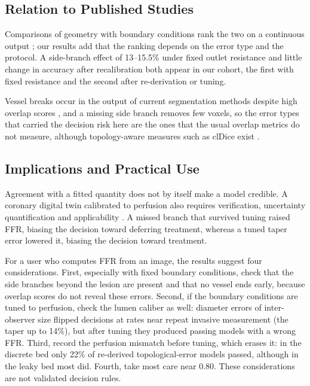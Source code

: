 \documentclass[journal,twoside,web]{ieeecolor}
\begin{document}
\subsection{Relation to Published Studies}
Comparisons of geometry with boundary conditions rank the two on a continuous output \cite{sankaran2016,tanade2022,korte2023};
our results add that the ranking depends on the error type and the protocol. A side-branch effect of 13--15.5\% under
fixed outlet resistance \cite{gamage2022} and little change in accuracy after recalibration \cite{gosling2020} both
appear in our cohort, the first with fixed resistance and the second after re-derivation or tuning.

Vessel breaks occur in the output of current segmentation methods despite high overlap scores \cite{bransby2026},
and a missing side branch removes few voxels, so the error types that carried the decision risk here are the ones that the usual overlap metrics do not measure, although topology-aware measures such as clDice
exist \cite{shit2021}.

\subsection{Implications and Practical Use}
Agreement with a fitted quantity does not by itself make a model credible. A coronary digital twin calibrated to perfusion also requires verification,
uncertainty quantification and applicability \cite{viceconti2025}. A missed branch that survived tuning raised FFR, biasing the decision toward
deferring treatment, whereas a tuned taper error lowered it, biasing the decision toward treatment.

For a user who computes FFR from an image, the results suggest four considerations. First, especially with fixed boundary conditions, check that the side branches
beyond the lesion are present and that no vessel ends early, because overlap scores do not reveal these errors.
Second, if the boundary conditions are tuned to perfusion, check the lumen caliber as well: diameter errors of
inter-observer size flipped decisions at rates near repeat invasive measurement (the taper up to 14\%), but after
tuning they produced passing models with a wrong FFR. Third, record the perfusion mismatch before tuning, which erases it: in the discrete bed
only 22\% of re-derived topological-error models passed, although in the leaky bed most did. Fourth, take most care near 0.80. These considerations are not validated decision rules.
\end{document}
